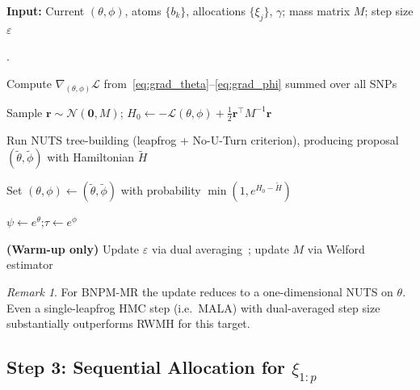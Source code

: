 \documentclass[12pt, a4paper]{article}
\theoremstyle{remark}
\newtheorem{remark}{Remark}
\newcommand{\Nor}{\mathcal{N}}
\newcommand{\pco}[1]{\item #1}                          %
\newcounter{pcline}
\newenvironment{pseudocode}{%
  \setcounter{pcline}{0}%
  \begin{list}{\scriptsize\arabic{pcline}.}{%
    \usecounter{pcline}%
    \setlength{\leftmargin}{2.5em}%
    \setlength{\itemsep}{1pt}%
    \setlength{\parsep}{0pt}%
    \setlength{\topsep}{3pt}%
    \small
  }%
}{%
  \end{list}%
}
\begin{document}
\bigskip
\begin{algfloat}[H]
\caption{NUTS Update for $(\log\psi,\log\tau)$}
\label{alg:nuts}
\begin{mdframed}[linewidth=0.6pt, innertopmargin=6pt, innerbottommargin=6pt]
\textbf{Input:} Current $(\theta,\phi)$, atoms $\{b_k\}$,
allocations $\{\xi_j\}$, $\gamma$; mass matrix $M$; step size $\varepsilon$
\begin{pseudocode}
\pco{Compute $\nabla_{(\theta,\phi)}\mathcal{L}$ from~\eqref{eq:grad_theta}--\eqref{eq:grad_phi} summed over all SNPs}
\pco{Sample $\mathbf{r} \sim \Nor(\mathbf{0}, M)$;\quad
     $H_0 \leftarrow -\mathcal{L}(\theta,\phi) + \tfrac{1}{2}\mathbf{r}^\top M^{-1}\mathbf{r}$}
\pco{Run NUTS tree-building (leapfrog + No-U-Turn criterion), producing proposal $(\tilde\theta,\tilde\phi)$ with Hamiltonian $\tilde H$}
\pco{Set $(\theta,\phi) \leftarrow (\tilde\theta,\tilde\phi)$ with probability $\min(1, e^{H_0 - \tilde H})$}
\pco{$\psi \leftarrow e^\theta$;\enspace $\tau \leftarrow e^\phi$}
\pco{\textbf{(Warm-up only)} Update $\varepsilon$ via dual averaging~\cite{Nesterov2009}; update $M$ via Welford estimator}
\end{pseudocode}
\end{mdframed}
\end{algfloat}

\begin{remark}
For BNPM-MR the update reduces to a one-dimensional NUTS on $\theta$.
Even a single-leapfrog HMC step (i.e.\ MALA) with dual-averaged step
size substantially outperforms RWMH for this target.
\end{remark}

\subsection{Step 3: Sequential Allocation for
  \texorpdfstring{$\xi_{1:p}$}{the partition}}
\end{document}
